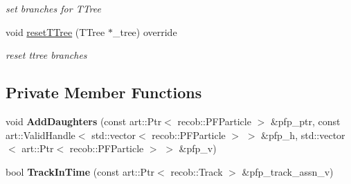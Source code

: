 \begin{DoxyCompactItemize}
\begin{DoxyCompactList}\small\item\em set branches for T\+Tree \end{DoxyCompactList}\item 
void \hyperlink{classanalysis_1_1ObviousCosmicFlashMatching_a8de3a3d2c1688baf8ba9b08dc8566498}{reset\+T\+Tree} (T\+Tree $\ast$\+\_\+tree) override\hypertarget{classanalysis_1_1ObviousCosmicFlashMatching_a8de3a3d2c1688baf8ba9b08dc8566498}{}\label{classanalysis_1_1ObviousCosmicFlashMatching_a8de3a3d2c1688baf8ba9b08dc8566498}

\begin{DoxyCompactList}\small\item\em reset ttree branches \end{DoxyCompactList}\end{DoxyCompactItemize}
\subsection*{Private Member Functions}
\begin{DoxyCompactItemize}
\item 
void {\bfseries Add\+Daughters} (const art\+::\+Ptr$<$ recob\+::\+P\+F\+Particle $>$ \&pfp\+\_\+ptr, const art\+::\+Valid\+Handle$<$ std\+::vector$<$ recob\+::\+P\+F\+Particle $>$ $>$ \&pfp\+\_\+h, std\+::vector$<$ art\+::\+Ptr$<$ recob\+::\+P\+F\+Particle $>$ $>$ \&pfp\+\_\+v)\hypertarget{classanalysis_1_1ObviousCosmicFlashMatching_a6a39083532d8b742b9f490d99c8f6ba2}{}\label{classanalysis_1_1ObviousCosmicFlashMatching_a6a39083532d8b742b9f490d99c8f6ba2}

\item 
bool {\bfseries Track\+In\+Time} (const art\+::\+Ptr$<$ recob\+::\+Track $>$ \&pfp\+\_\+track\+\_\+assn\+\_\+v)\hypertarget{classanalysis_1_1ObviousCosmicFlashMatching_a4eaa251b09b9ede8ddf15abfe54acb5d}{}\label{classanalysis_1_1ObviousCosmicFlashMatching_a4eaa251b09b9ede8ddf15abfe54acb5d}

\end{DoxyCompactItemize}
